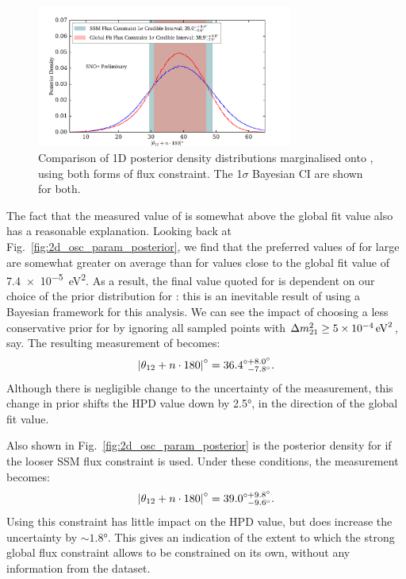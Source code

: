 \begin{figure}
    \centering
    \includegraphics[width=0.75\textwidth]{6_SolarAnalysis/images/theta_12_comparison_flux_constraint_corrected_tagging_2_mobins.pdf}
    \caption[Comparison of 1D posterior density distribution marginalised onto \tonetwo{} for different flux constraints]
    {Comparison of 1D posterior density distributions marginalised onto \tonetwo{}, using both forms of \beight{} flux constraint. The 1$\sigma$ Bayesian CI are shown for both.}
    \label{fig:1d_theta_12_posterior}
\end{figure}

The fact that the measured value of \tonetwo{} is somewhat above the global fit value also has a reasonable explanation. Looking back at Fig.~\ref{fig:2d_osc_param_posterior}, we find that the preferred values of \tonetwo{} for large \dmsq{} are somewhat greater on average than for \dmsq{} values close to the global fit value of \SI{7.4e-5}{\eV\squared}. As a result, the final value quoted for \tonetwo{} is dependent on our choice of the prior distribution for \dmsq{}: this is an inevitable result of using a Bayesian framework for this analysis. We can see the impact of choosing a less conservative prior for \dmsq{} by ignoring all sampled points with $\dmsq{} \geq \SI{5e-4}{\eV\squared}$, say. The resulting measurement of \tonetwo{} becomes:
\begin{equation*}
    \left|\theta_{12}{} + n\cdot180\right|^{\circ} = 36.4^{\circ+8.0^{\circ}}_{\phantom{\circ}-7.8^{\circ}}.
\end{equation*}
Although there is negligible change to the uncertainty of the measurement, this change in prior shifts the HPD value down by \ang{2.5}, in the direction of the global fit value.

Also shown in Fig.~\ref{fig:2d_osc_param_posterior} is the posterior density for \tonetwo{} if the looser SSM flux constraint is used. Under these conditions, the measurement becomes:
\begin{equation*}
    \left|\theta_{12}{} + n\cdot180\right|^{\circ} = 39.0^{\circ+9.8^{\circ}}_{\phantom{\circ}-9.6^{\circ}}.
\end{equation*}
Using this constraint has little impact on the HPD value, but does increase the uncertainty by $\sim\ang{1.8}$. This gives an indication of the extent to which the strong global flux constraint allows \tonetwo{} to be constrained on its own, without any information from the dataset.

